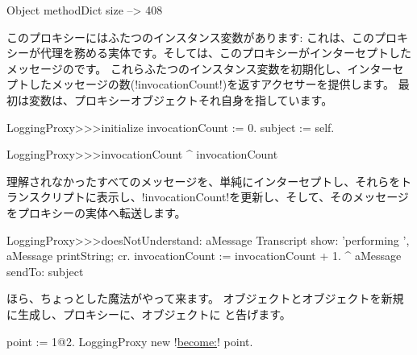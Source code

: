\documentclass[a4paper,10pt,twoside]{book}
\begin{document}
\begin{code}{}
Object methodDict size --> 408
\end{code}

このプロキシーにはふたつのインスタンス変数があります:  これは、このプロキシーが代理を務める実体です。そしては、このプロキシーがインターセプトしたメッセージのです。
これらふたつのインスタンス変数を初期化し、インターセプトしたメッセージの数(\ct!invocationCount!)を返すアクセサーを提供します。
最初は変数は、プロキシーオブジェクトそれ自身を指しています。
\begin{code}{}
LoggingProxy>>>initialize
	invocationCount := 0.
	subject := self.
\end{code}

\begin{code}{}
LoggingProxy>>>invocationCount
	^ invocationCount
\end{code}

理解されなかったすべてのメッセージを、単純にインターセプトし、それらをトランスクリプトに表示し、\ct!invocationCount!を更新し、そして、そのメッセージをプロキシーの実体へ転送します。
\begin{code}{}
LoggingProxy>>>doesNotUnderstand: aMessage 
	Transcript show: 'performing ', aMessage printString; cr.
	invocationCount := invocationCount + 1.
	^ aMessage sendTo: subject
\end{code}

ほら、ちょっとした魔法がやって来ます。%
オブジェクトとオブジェクトを新規に生成し、プロキシーに、オブジェクトに と告げます。
\begin{code}{}
point := 1@2.
LoggingProxy new !\underline{become:}! point.
\end{code}
\end{document}
